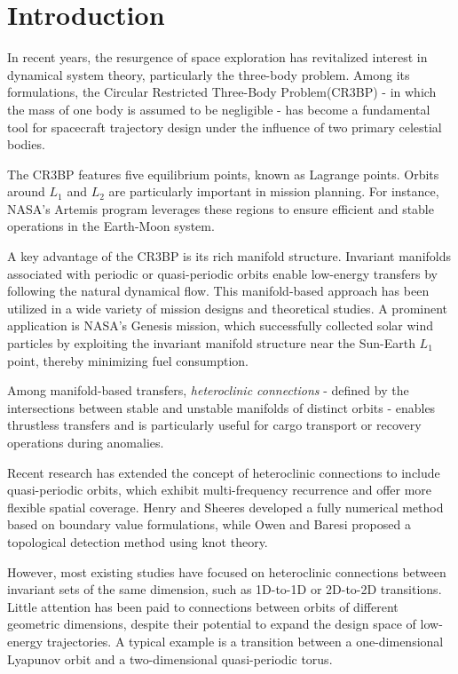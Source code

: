 \documentclass[JESA]{tjsass} %
\begin{document}
\section{Introduction}

In recent years, the resurgence of space exploration has revitalized interest in dynamical system theory, particularly the three-body problem. Among its formulations, the Circular Restricted Three-Body Problem(CR3BP) - in which the mass of one body is assumed to be negligible - has become a fundamental tool for spacecraft trajectory design under the influence of two primary celestial bodies.\cite{barrowgreen1997,szebehely1967} 

The CR3BP features five equilibrium points, known as Lagrange points. Orbits around $L_1$ and $L_2$ are particularly important in mission planning. For instance, NASA's Artemis program leverages these regions to ensure efficient and stable operations in the Earth-Moon system.

A key advantage of the CR3BP is its rich manifold structure. Invariant manifolds associated with periodic or quasi-periodic orbits enable low-energy transfers by following the natural dynamical flow. This manifold-based approach has been utilized in a wide variety of mission designs and theoretical studies.\cite{anderson2009,sanchez2016,kakoi2014,cox2021,dellnitz2006,moore2012,villegaspinto2021} A prominent application is NASA's Genesis mission, which successfully collected solar wind particles by exploiting the invariant manifold structure near the Sun-Earth $L_1$ point, thereby minimizing fuel consumption.\cite{koon2000}

Among manifold-based transfers, \textit{heteroclinic connections} - defined by the intersections between stable and unstable manifolds of distinct orbits - enables thrustless transfers and is particularly useful for cargo transport or recovery operations during anomalies.\cite{koon2000,henry2024,owen2024,olikara2016}

Recent research has extended the concept of heteroclinic connections to include quasi-periodic orbits, which exhibit multi-frequency recurrence and offer more flexible spatial coverage. Henry and Sheeres\cite{henry2024} developed a fully numerical method based on boundary value formulations, while Owen and Baresi\cite{owen2024} proposed a topological detection method using knot theory.

However, most existing studies have focused on heteroclinic connections between invariant sets of the same dimension, such as 1D-to-1D or 2D-to-2D transitions. Little attention has been paid to connections between orbits of different geometric dimensions, despite their potential to expand the design space of low-energy trajectories. A typical example is a transition between a one-dimensional Lyapunov orbit and a two-dimensional quasi-periodic torus.
\end{document}
